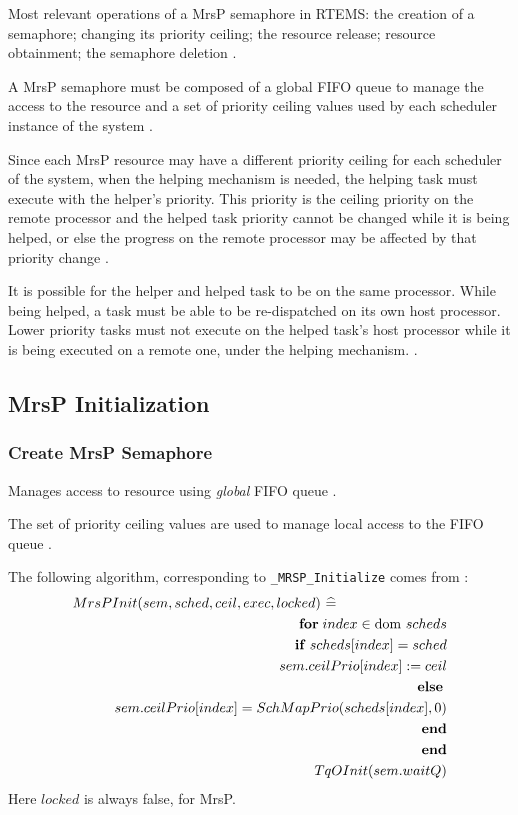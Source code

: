 Most relevant operations of a MrsP semaphore in RTEMS:
the creation of a semaphore;
changing its priority ceiling;
the resource release;
resource obtainment;
the semaphore deletion
\cite{Gomes:2019:MrsP}.

A MrsP semaphore must be composed of
a global FIFO queue to manage the access to the resource
and a set of priority ceiling values
used by each scheduler instance of the system
\cite{Gomes:2019:MrsP}.

Since each MrsP resource may have a different priority ceiling
for each scheduler of the system,
when the helping mechanism is needed,
the helping task must execute with the helper’s priority.
This priority is the ceiling priority on the remote processor
and the helped task priority cannot be changed while it is being helped,
or else the progress on the remote processor
may be affected by that priority change
\cite{Gomes:2019:MrsP}.

It is possible for the helper and helped task to be on the same processor.
While being helped,
a task must be able to be re-dispatched on its own host processor.
Lower priority tasks must not execute on the helped task’s host processor
while it is being executed on a remote one,
under the helping mechanism.
\cite{Gomes:2019:MrsP}.

\subsection{MrsP Initialization}

\subsubsection{Create MrsP Semaphore}

Manages access to resource using \emph{global} FIFO queue
\cite{Gomes:2019:MrsP}.

The set of priority ceiling values are used
to manage local access to the FIFO queue
\cite{Gomes:2019:MrsP}.

The following algorithm,
corresponding to \verb"_MRSP_Initialize"
 comes from \cite[Fig. 13, p42]{Gomes:2019:MrsP}:
\begin{eqnarray*}
   \lefteqn{MrsPInit(sem,sched,ceil,exec,locked)~\defs}
\\ && \FOR index \in \textrm{dom }scheds
\\ && \quad \IF scheds[index] = sched
\\ && \qquad sem.ceilPrio[index] := ceil
\\ && \quad \ELSE
\\ && \qquad sem.ceilPrio[index] = SchMapPrio(scheds[index],0)
\\ && \quad \END
\\ && \END
\\ && TqOInit(sem.waitQ)
\end{eqnarray*}
Here $locked$ is always false, for MrsP.


